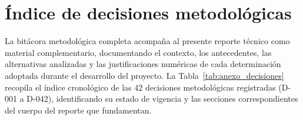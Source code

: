 
\section{Índice de decisiones metodológicas}\label{anx:decisiones}

La bitácora metodológica completa acompaña al presente reporte técnico como material complementario,
documentando el contexto, los antecedentes, las alternativas analizadas y las justificaciones numéricas
de cada determinación adoptada durante el desarrollo del proyecto. La Tabla~\ref{tab:anexo_decisiones}
recopila el índice cronológico de las 42 decisiones metodológicas registradas (D-001 a D-042), identificando
su estado de vigencia y las secciones correspondientes del cuerpo del reporte que fundamentan.


